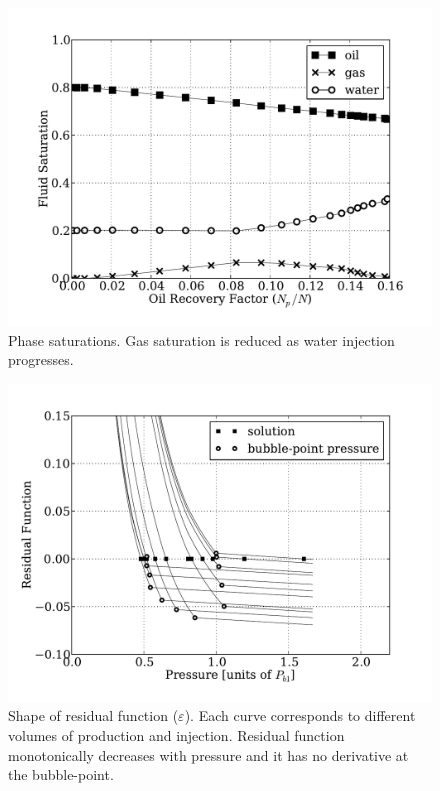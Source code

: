 \documentclass[authoryear,preprint,review,12pt]{elsarticle}
\begin{document}
\begin{figure}
\centering
\includegraphics[width=\linewidth]{./python/matbal_S}
\caption{Phase saturations. Gas saturation is reduced as water injection progresses.}
\label{fig: matbal_s}
\end{figure}


\begin{figure}
\centering
\includegraphics[width=\linewidth]{./python/matbal_res}
\caption{Shape of residual function ($\varepsilon$). Each curve corresponds to different volumes of production and injection. Residual function monotonically decreases with pressure and it has no derivative at the bubble-point.}
\label{fig: epsilon}
\end{figure}
\end{document}
